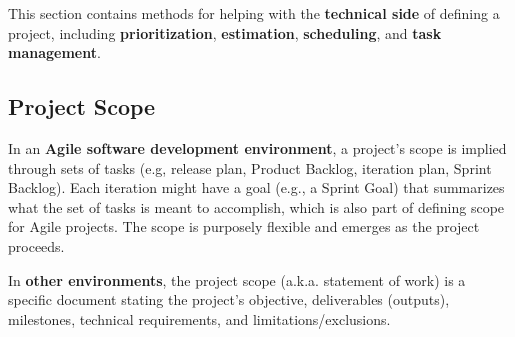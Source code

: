 This section contains methods for helping with the \textbf{technical side} of defining a project, including \textbf{prioritization}, \textbf{estimation}, \textbf{scheduling}, and \textbf{task management}.

\marginpar{\releasePlanDef\margindivider}\marginpar{\productBacklogDef\margindivider}\marginpar{\iterationPlanDef\margindivider}\marginpar{\sprintBacklogDef}
\subsection{Project Scope}
In an \textbf{Agile software development environment}, a project's scope is implied through sets of tasks (e.g, release plan, Product Backlog, iteration plan, Sprint Backlog). Each iteration might have a goal (e.g., a Sprint Goal) that summarizes what the set of tasks is meant to accomplish, which is also part of defining scope for Agile projects. The scope is purposely flexible and emerges as the project proceeds.

In \textbf{other environments}, the project scope (a.k.a. statement of work) is a specific document stating the project's objective, deliverables (outputs), milestones, technical requirements, and limitations/exclusions. 

